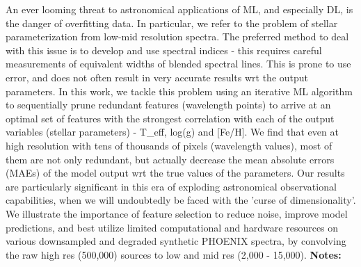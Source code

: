\documentclass{report}
\begin{document}
{{{{{{{{{{{{{{{{{{{{{{{{{{{{{{{{{{{{{{{{{{{{{{{{{{{{{{{{{{{{{{An ever looming threat to astronomical applications of ML, and especially DL, is the danger of overfitting data. In particular, we refer to the problem of stellar parameterization from low-mid resolution spectra. The preferred method to deal with this issue is to develop and use spectral indices - this requires careful measurements of equivalent widths of blended spectral lines. This is prone to use error, and does not often result in very accurate results wrt the output parameters. In this work, we tackle this problem using an iterative ML algorithm to sequentially prune redundant features (wavelength points) to arrive at an optimal set of features with the strongest correlation with each of the output variables (stellar parameters) - T\_eff, log(g) and [Fe/H]. We find that even at high resolution with tens of thousands of pixels (wavelength values), most of them are not only redundant, but actually decrease the mean absolute errors (MAEs) of the model output wrt the true values of the parameters. Our results are particularly significant in this era of exploding astronomical observational capabilities, when we will undoubtedly be faced with the 'curse of dimensionality'. We illustrate the importance of feature selection to reduce noise, improve model predictions, and best utilize limited computational and hardware resources on various downsampled and degraded synthetic PHOENIX spectra, by convolving the raw high res (500,000) sources to low and mid res (2,000 - 15,000).\newline
{\bf Notes:}\newline
{\newpage
}}}}}}}}}}}}}}}}}}}}}}}}}}}}}}}}}}}}}}}}}}}}}}}}}}}}}}}}}}}}}}}
\end{document}
